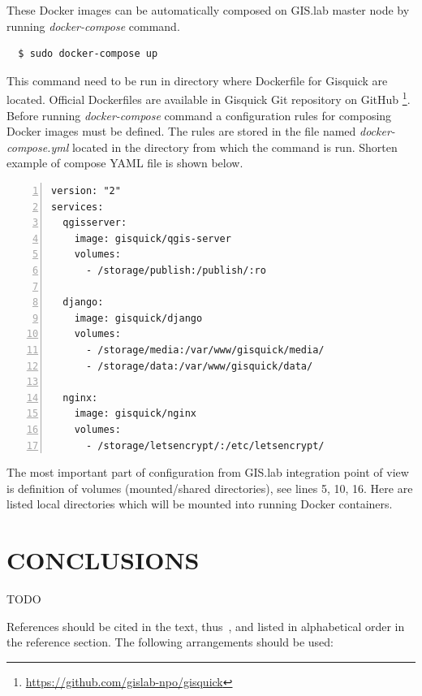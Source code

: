 \documentclass{isprs}
\begin{document}
These Docker images can be automatically composed on GIS.lab master
node by running \textit{docker-compose} command.

\begin{lstlisting}
  $ sudo docker-compose up
\end{lstlisting}

This command need to be run in directory where Dockerfile for Gisquick
are located. Official Dockerfiles are available in Gisquick Git
repository on GitHub
\footnote{\url{https://github.com/gislab-npo/gisquick}}. Before
running \textit{docker-compose} command a configuration rules for
composing Docker images must be defined. The rules are stored in the
file named \textit{docker-compose.yml} located in the directory from
which the command is run. Shorten example of compose YAML file is
shown below.

\begin{lstlisting}[numbers=left,xleftmargin=1em]
version: "2"
services:
  qgisserver:
    image: gisquick/qgis-server
    volumes:
      - /storage/publish:/publish/:ro

  django:
    image: gisquick/django
    volumes:
      - /storage/media:/var/www/gisquick/media/
      - /storage/data:/var/www/gisquick/data/

  nginx:
    image: gisquick/nginx
    volumes:
      - /storage/letsencrypt/:/etc/letsencrypt/
\end{lstlisting}

The most important part of configuration from GIS.lab integration
point of view is definition of volumes (mounted/shared directories),
see lines 5, 10, 16. Here are listed local directories which will be
mounted into running Docker containers.

\section{CONCLUSIONS}

TODO

{%
  \begin{spacing}{0.9}%
  \end{spacing}
}

References should be cited in the text, thus~\cite{smith1987rep}, and
listed in alphabetical order in the reference section. The following
arrangements should be used:
\end{document}

